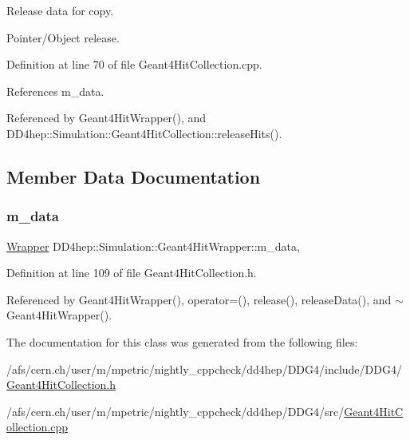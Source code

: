 Release data for copy. 

Pointer/\+Object release. 

Definition at line 70 of file Geant4\+Hit\+Collection.\+cpp.



References m\+\_\+data.



Referenced by Geant4\+Hit\+Wrapper(), and D\+D4hep\+::\+Simulation\+::\+Geant4\+Hit\+Collection\+::release\+Hits().



\subsection{Member Data Documentation}
\hypertarget{class_d_d4hep_1_1_simulation_1_1_geant4_hit_wrapper_a2344f57f3d02ecd148c2b4893dffe660}{}\label{class_d_d4hep_1_1_simulation_1_1_geant4_hit_wrapper_a2344f57f3d02ecd148c2b4893dffe660} 
\subsubsection{\texorpdfstring{m\+\_\+data}{m\_data}}
{\footnotesize\ttfamily \hyperlink{class_d_d4hep_1_1_simulation_1_1_geant4_hit_wrapper_a4779e35eba7d553e0f2d497c49a42ec6}{Wrapper} D\+D4hep\+::\+Simulation\+::\+Geant4\+Hit\+Wrapper\+::m\+\_\+data\hspace{0.3cm}{\ttfamily [mutable]}, {\ttfamily [protected]}}



Definition at line 109 of file Geant4\+Hit\+Collection.\+h.



Referenced by Geant4\+Hit\+Wrapper(), operator=(), release(), release\+Data(), and $\sim$\+Geant4\+Hit\+Wrapper().



The documentation for this class was generated from the following files\+:\begin{DoxyCompactItemize}
\item 
/afs/cern.\+ch/user/m/mpetric/nightly\+\_\+cppcheck/dd4hep/\+D\+D\+G4/include/\+D\+D\+G4/\hyperlink{_geant4_hit_collection_8h}{Geant4\+Hit\+Collection.\+h}\item 
/afs/cern.\+ch/user/m/mpetric/nightly\+\_\+cppcheck/dd4hep/\+D\+D\+G4/src/\hyperlink{_geant4_hit_collection_8cpp}{Geant4\+Hit\+Collection.\+cpp}\end{DoxyCompactItemize}
